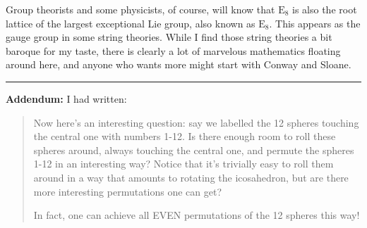 \documentclass{article}
\begin{document}
Group theorists and some physicists, of course, will know that
\(\mathrm{E}_8\) is also the root lattice of the largest exceptional Lie
group, also known as \(\mathrm{E}_8\). This appears as the gauge group
in some string theories. While I find those string theories a bit
baroque for my taste, there is clearly a lot of marvelous mathematics
floating around here, and anyone who wants more might start with Conway
and Sloane.

\begin{center}\rule{0.5\linewidth}{0.5pt}\end{center}

\textbf{Addendum:} I had written:

\begin{quote}
Now here's an interesting question: say we labelled the 12 spheres
touching the central one with numbers 1-12. Is there enough room to roll
these spheres around, always touching the central one, and permute the
spheres 1-12 in an interesting way? Notice that it's trivially easy to
roll them around in a way that amounts to rotating the icosahedron, but
are there more interesting permutations one can get?

In fact, one can achieve all EVEN permutations of the 12 spheres this
way!
\end{quote}
\end{document}
